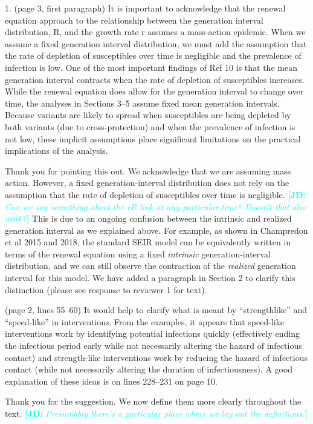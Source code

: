 \documentclass[12pt]{article}
\newcommand{\revtext}{\textsf}
\newcommand{\comment}[3]{\textcolor{#1}{\textbf{[#2: }\textsl{#3}\textbf{]}}}
\newcommand{\jd}[1]{\comment{cyan}{JD}{#1}}
\begin{document}
\revtext{1. (page 3, first paragraph) It is important to acknowledge that the renewal equation approach to the relationship between the generation interval
distribution, R, and the growth rate r assumes a mass-action epidemic.
When we assume a fixed generation interval distribution, we must add the
assumption that the rate of depletion of susceptibles over time is negligible and the prevalence of infection is low. One of the most important
findings of Ref 10 is that the mean generation interval contracts when the
rate of depletion of susceptibles increases. While the renewal equation
does allow for the generation interval to change over time, the analyses
in Sections 3–5 assume fixed mean generation intervals. Because variants
are likely to spread when susceptibles are being depleted by both variants
(due to cross-protection) and when the prevalence of infection is not low, these implicit assumptions place significant limitations on the practical
implications of the analysis.}

Thank you for pointing this out.
We acknowledge that we are assuming mass action.
However, a fixed generation-interval distribution does not rely on the assumption that the rate of depletion of susceptibles over time is negligible.
\jd{Can we say something about the rR link at any particular time? Doesn't that also work?}
This is due to an ongoing confusion between the intrinsic and realized generation interval as we explained above.
For example, as shown in Champredon et al 2015 and 2018, the standard SEIR model can be equivalently written in terms of the renewal equation using a fixed \emph{intrinsic} generation-interval distribution, and we can still observe the contraction of the \emph{realized} generation interval for this model.
We have added a paragraph in Section 2 to clarify this distinction (please see response to reviewer 1 for text).

\revtext{(page 2, lines 55–60) It would help to clarify what is meant by “strengthlike” and “speed-like” in interventions. From the examples, it appears that
speed-like interventions work by identifying potential infections quickly
(effectively ending the infectious period early while not necessarily altering
the hazard of infectious contact) and strength-like interventions work by
reducing the hazard of infectious contact (while not necessarily altering
the duration of infectiousness). A good explanation of these ideas is on
lines 228–231 on page 10.}

Thank you for the suggestion. We now define them more clearly throughout the text. \jd{Presumably there's a particular place where we lay out the definitions.}
\end{document}
